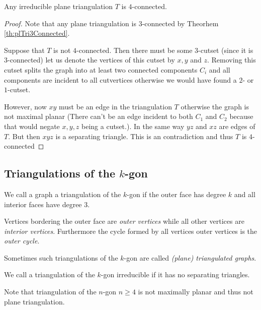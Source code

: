 
\begin{thrm}
Any irreducible plane triangulation $T$ is $4$-connected.
\end{thrm}

\begin{proof}
Note that any plane triangulation is $3$-connected by Theorhem \ref{th:plTri3Connected}.

Suppose that $T$ is not $4$-connected. Then there must be some $3$-cutset (since it is $3$-connected) let us denote the vertices of this cutset by $x, y$ and $z$. Removing this cutset splits the graph into at least two connected components $C_i$ and all components are incident to all cutvertices otherwise we would have found a $2$- or $1$-cutset.

However, now $xy$ must be an edge in the triangulation $T$ otherwise the graph is not maximal planar (There can't be an edge incident to both $C_1$ and $C_2$ because that would negate $x, y ,z$ being a cutset.). In the same way $yz$ and $xz$ are edges of $T$. But then $xyz$ is a separating triangle. This is an contradiction and thus $T$ is $4$-connected
\end{proof}

\subsection{Triangulations of the $k$-gon}

\begin{defi}
We call a graph a triangulation of the $k$-gon if the outer face has degree $k$ and all interior faces have degree $3$.
\end{defi}
Vertices bordering the outer face are \emph{outer vertices} while all other vertices are \emph{interior vertices}. Furthermore the cycle formed by all vertices outer vertices is the \emph{outer cycle}.

Sometimes such triangulations of the $k$-gon are called \emph{(plane) triangulated graphs}.


\begin{defi}
We call a triangulation of the $k$-gon irreducible if it has no separating triangles.
\end{defi}


Note that triangulation of the $n$-gon $n\geq 4$ is not maximally planar and thus not plane triangulation.

